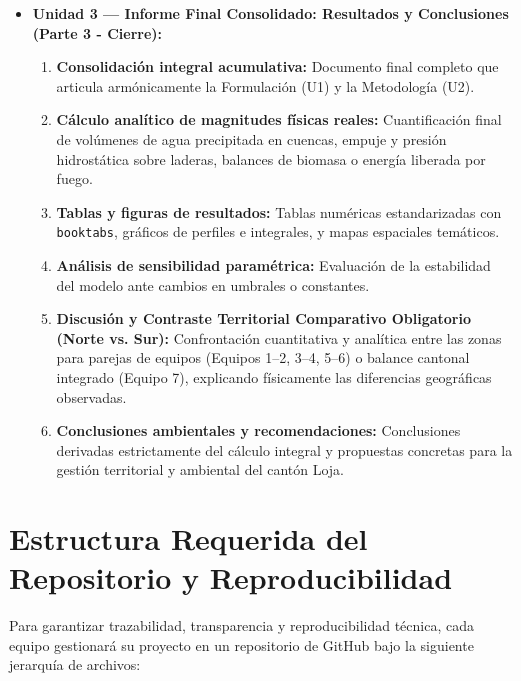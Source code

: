 \documentclass[11pt,a4paper]{article}
\begin{document}
\begin{guidelinebox}[title=Estructura Acumulativa del Informe por Unidad]
\begin{itemize}[leftmargin=*,itemsep=3pt]
  \item \textbf{Unidad 3 — Informe Final Consolidado: Resultados y Conclusiones (Parte 3 - Cierre):}
  \begin{enumerate}[label=\alph*),itemsep=1.5pt]
    \item \textbf{Consolidación integral acumulativa:} Documento final completo que articula armónicamente la Formulación (U1) y la Metodología (U2).
    \item \textbf{Cálculo analítico de magnitudes físicas reales:} Cuantificación final de volúmenes de agua precipitada en cuencas, empuje y presión hidrostática sobre laderas, balances de biomasa o energía liberada por fuego.
    \item \textbf{Tablas y figuras de resultados:} Tablas numéricas estandarizadas con \texttt{booktabs}, gráficos de perfiles e integrales, y mapas espaciales temáticos.
    \item \textbf{Análisis de sensibilidad paramétrica:} Evaluación de la estabilidad del modelo ante cambios en umbrales o constantes.
    \item \textbf{Discusión y Contraste Territorial Comparativo Obligatorio (Norte vs. Sur):} Confrontación cuantitativa y analítica entre las zonas para parejas de equipos (Equipos 1--2, 3--4, 5--6) o balance cantonal integrado (Equipo 7), explicando físicamente las diferencias geográficas observadas.
    \item \textbf{Conclusiones ambientales y recomendaciones:} Conclusiones derivadas estrictamente del cálculo integral y propuestas concretas para la gestión territorial y ambiental del cantón Loja.
  \end{enumerate}
\end{itemize}
\end{guidelinebox}

\section{Estructura Requerida del Repositorio y Reproducibilidad}

Para garantizar trazabilidad, transparencia y reproducibilidad técnica, cada equipo gestionará su proyecto en un repositorio de GitHub bajo la siguiente jerarquía de archivos:
\end{document}
